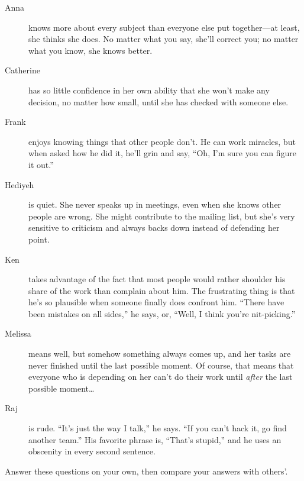 \begin{description}

\item[Anna]
  knows more about every subject than everyone else put together---at least,
  she thinks she does.
  No matter what you say,
  she'll correct you;
  no matter what you know, she knows better.

\item[Catherine]
  has so little confidence in her own ability
  that she won't make any decision,
  no matter how small,
  until she has checked with someone else.

\item[Frank]
  enjoys knowing things that other people don't.
  He can work miracles,
  but when asked how he did it,
  he'll grin and say,
  ``Oh, I'm sure you can figure it out.''

\item[Hediyeh]
  is quiet.
  She never speaks up in meetings,
  even when she knows other people are wrong.
  She might contribute to the mailing list,
  but she's very sensitive to criticism
  and always backs down instead of defending her point.

\item[Ken]
  takes advantage of the fact that most people would rather shoulder his share of the work
  than complain about him.
  The frustrating thing is that he's so plausible when someone finally does confront him.
  ``There have been mistakes on all sides,''
  he says,
  or, ``Well, I think you're nit-picking.''

\item[Melissa]
  means well,
  but somehow something always comes up,
  and her tasks are never finished until the last possible moment.
  Of course,
  that means that everyone who is depending on her can't do their work
  until \emph{after} the last possible moment{\ldots}

\item[Raj]
  is rude.
  ``It's just the way I talk,'' he says.
  ``If you can't hack it, go find another team.''
  His favorite phrase is, ``That's stupid,''
  and he uses an obscenity in every second sentence.

\end{description}


Answer these questions on your own,
then compare your answers with others'.

